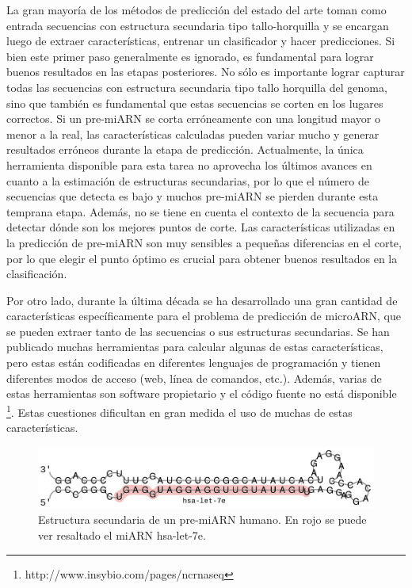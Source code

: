 La gran mayoría de los métodos de predicción del estado del arte toman como entrada secuencias con estructura secundaria tipo tallo-horquilla y se encargan
luego de extraer características, entrenar un clasificador y hacer predicciones. Si bien este primer paso generalmente es ignorado, es fundamental para lograr
buenos resultados en las etapas posteriores. No sólo es importante lograr capturar todas las secuencias con estructura secundaria tipo tallo horquilla del
genoma, sino que también es fundamental que estas secuencias se corten en los lugares correctos. Si un pre-miARN se corta erróneamente con una longitud mayor
o menor a la real, las características calculadas pueden variar mucho y generar resultados erróneos durante la etapa de predicción. Actualmente, la única
herramienta disponible para esta tarea \citep{durbin1999einverted} no aprovecha los últimos avances en cuanto a la estimación de estructuras secundarias, por
lo que el número de secuencias que detecta es bajo y muchos pre-miARN se pierden durante esta temprana etapa. Además, no se tiene en cuenta el contexto de la
secuencia para detectar dónde son los mejores puntos de corte. Las características utilizadas en la predicción de pre-miARN son muy sensibles a pequeñas
diferencias en el corte, por lo que elegir el punto óptimo es crucial para obtener buenos resultados en la clasificación.

Por otro lado, durante la última década se ha desarrollado una gran cantidad de características específicamente para el problema de predicción de
microARN, que se pueden extraer tanto de las secuencias o sus estructuras secundarias. Se han publicado muchas herramientas para calcular algunas de estas
características, pero estas están codificadas en diferentes lenguajes de programación y tienen diferentes modos de acceso (web, línea de comandos, etc.).
Además, varias de estas herramientas son software propietario y el código fuente no está disponible \footnote{http://www.insybio.com/pages/ncrnaseq}. Estas
cuestiones dificultan en gran medida el uso de muchas de estas características.

\begin{figure}[t]
	\centering
	\includegraphics[width=\textwidth]{fig/mirna.pdf}
	\caption[Estructura secundaria de un pre-miARN]{Estructura secundaria de un pre-miARN humano. En rojo se puede ver resaltado el miARN hsa-let-7e.}
	\label{fig:mirna}
\end{figure}

